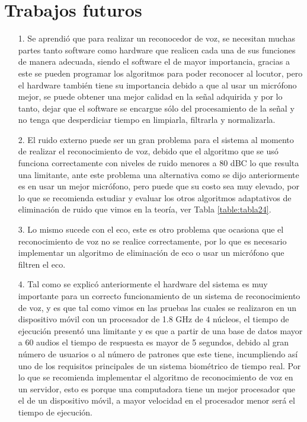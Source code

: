 \section{Trabajos futuros}
\begin{enumerate}
\item[1.]Se aprendió que para realizar un reconocedor de voz, se necesitan muchas partes tanto software como hardware que realicen cada una de sus funciones de manera adecuada, siendo el software el de mayor importancia, gracias a este se pueden programar los algoritmos para poder reconocer al locutor, pero el hardware también tiene su importancia debido a que al usar un micrófono mejor, se puede obtener una mejor calidad en la señal adquirida y por lo tanto, dejar que el software se encargue sólo del procesamiento de la señal y no tenga que desperdiciar tiempo en limpiarla, filtrarla y normalizarla.

\item[2.]El ruido externo puede ser un gran problema para el sistema al momento de realizar el reconocimiento de voz, debido que el algoritmo que se usó funciona correctamente con niveles de ruido menores a 80 dBC lo que resulta una limitante, ante este problema una alternativa como se dijo anteriormente es en usar un mejor micrófono, pero puede que su costo sea muy elevado, por lo que se recomienda estudiar y evaluar los otros algoritmos adaptativos de eliminación de ruido que vimos en la teoría, ver Tabla \ref{table:tabla24}.

\item[3.]Lo mismo sucede con el eco, este es otro problema que ocasiona que el reconocimiento de voz no se realice correctamente, por lo que es necesario implementar un algoritmo de eliminación de eco o usar un micrófono que filtren el eco.

\item[4.]Tal como se explicó anteriormente el hardware del sistema es muy importante para un correcto funcionamiento de un sistema de reconocimiento de voz, y es que tal como vimos en las pruebas las cuales se realizaron en un dispositivo móvil con un procesador de 1.8 GHz de 4 núcleos, el tiempo de ejecución presentó una limitante y es que a partir de una base de datos mayor a 60 audios el tiempo de respuesta es mayor de 5 segundos, debido al gran número de usuarios o al número de patrones que este tiene, incumpliendo así uno de los requisitos principales de un sistema biométrico de tiempo real. 
\vskip 0.5cm
Por lo que se recomienda implementar el algoritmo de reconocimiento de voz en un servidor, esto es porque una computadora tiene un mejor procesador que el de un dispositivo móvil, a mayor velocidad en el procesador menor será el tiempo de ejecución.


\end{enumerate}
